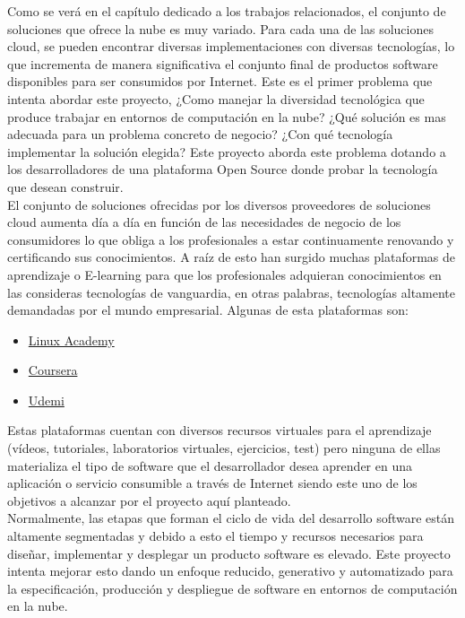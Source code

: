\documentclass[a4paper,11pt]{book}
\begin{document}
Como se verá en el capítulo dedicado a los trabajos relacionados, el conjunto de soluciones que ofrece la nube es muy variado. Para cada una de las soluciones cloud, se pueden encontrar diversas implementaciones con diversas tecnologías, lo que incrementa
de manera significativa el conjunto final de productos software disponibles para ser consumidos por Internet. Este es el primer problema que intenta abordar este proyecto, ¿Como manejar la diversidad tecnológica que produce trabajar en entornos de computación
en la nube? ¿Qué solución es mas adecuada para un problema concreto de negocio? ¿Con qué tecnología implementar la solución elegida? Este proyecto aborda este problema dotando a los desarrolladores de una plataforma Open Source donde probar la tecnología que desean construir.\\

El conjunto de soluciones ofrecidas por los diversos proveedores de soluciones cloud aumenta día a día en función de las necesidades de negocio de los consumidores lo que obliga a los profesionales a estar continuamente renovando y certificando sus conocimientos. A raíz de esto han surgido muchas plataformas de aprendizaje o E-learning para que los profesionales adquieran conocimientos en las consideras tecnologías de vanguardia,  en otras palabras, tecnologías altamente demandadas por el mundo empresarial. Algunas de esta plataformas son:

\begin{itemize}
\item \href{https://linuxacademy.com/}{Linux Academy}
\item \href{https://es.coursera.org/}{Coursera}
\item \href{https://www.udemy.com}{Udemi}
\end{itemize}

Estas plataformas cuentan con diversos recursos virtuales para el aprendizaje (vídeos, tutoriales, laboratorios virtuales, ejercicios, test) pero ninguna de ellas materializa el tipo de software que el desarrollador desea aprender en una aplicación o servicio consumible a través de Internet siendo este uno de los objetivos a alcanzar por el proyecto aquí planteado. \\


Normalmente, las etapas que forman el ciclo de vida del desarrollo software están altamente segmentadas y debido a esto el tiempo y recursos necesarios para diseñar, implementar y desplegar un producto software es elevado.  Este proyecto intenta mejorar esto dando un enfoque reducido, generativo y automatizado para la especificación, producción y despliegue de software en entornos de computación en la nube.  
\end{document}
